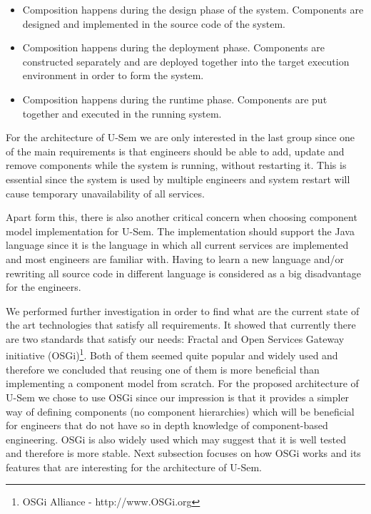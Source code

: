 \begin{itemize}
	\item  Composition happens during the design phase of the system. Components are designed and implemented in the source code of the system.
	\item  Composition happens during the deployment phase. Components are constructed separately and are deployed together into the target execution environment in order to form the system.
	\item Composition happens during the runtime phase. Components are put together and executed in the running system.
\end{itemize}

For the architecture of U-Sem we are only interested in the last group since one of the main requirements is that engineers should be able to add, update and remove components while the system is running, without restarting it. This is essential since the system is used by multiple engineers and system restart will cause temporary unavailability of all services. 

Apart form this, there is also another critical concern when choosing component model implementation for U-Sem. The implementation should support the Java language since it is the language in which all current services are implemented and most engineers are familiar with. Having to learn a new language and/or rewriting all source code in different language is considered as a big disadvantage for the engineers.

We performed further investigation in order to find what are the current state of the art technologies that satisfy all requirements. It showed that currently there are two standards that satisfy our needs: Fractal \cite{bruneton2006fractal} and Open Services Gateway initiative (OSGi)\footnote{OSGi Alliance - http://www.OSGi.org}. Both of them seemed quite popular and widely used and therefore we concluded that reusing one of them is more beneficial than implementing a component model from scratch. For the proposed architecture of U-Sem we chose to use OSGi since our impression is that it provides a simpler way of defining components (no component hierarchies) which will be beneficial for engineers that do not have so in depth knowledge of component-based engineering. OSGi is also widely used \cite{tavares2008gentle} which may suggest that it is well tested and therefore is more stable. Next subsection focuses on how OSGi works and its features that are interesting for the architecture of U-Sem.


